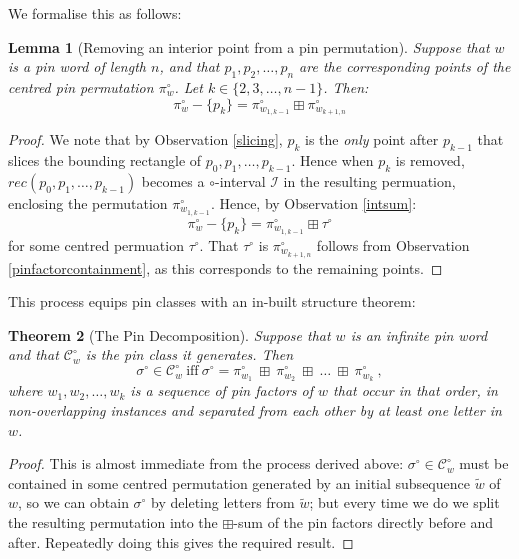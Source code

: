\documentclass[11pt,a4paper]{article}
\newtheorem{thm}{Theorem}[section]
\newtheorem{lemma}[thm]{Lemma}
\theoremstyle{definition}
\newcommand{\CCC}{\mathcal{C}}
\let\C\CCC
\begin{document}
We formalise this as follows:

\begin{lemma}[Removing an interior point from a pin permutation] \label{lemma:pindec}
Suppose that $w$ is a pin word of length $n$, and that $p_{1}, p_{2}, \dots, p_{n}$ are the corresponding points of the centred pin permutation $\pi_{w}^{\circ}$. Let $k \in \{2,3,\dots,n-1\}$. Then:
\[
\pi_{w}^{\circ} - \{p_{k}\} = \pi_{w_{1,k-1}}^{\circ} \boxplus \pi_{w_{k+1,n}}^{\circ}
\]
\end{lemma}

\begin{proof}
We note that by Observation \ref{slicing}, $p_{k}$ is the \emph{only} point after $p_{k-1}$ that slices the bounding rectangle of $p_{0}, p_{1}, \dots, p_{k-1}$. Hence when $p_{k}$ is removed, $rec(p_{0}, p_{1}, \dots, p_{k-1})$ becomes a $\circ$-interval $\mathcal{I}$ in the resulting permuation, enclosing the permutation $\pi^{\circ}_{w_{1,k-1}}$. Hence, by Observation \ref{intsum}:
\[
\pi_{w}^{\circ} - \{p_{k}\} = \pi_{w_{1,k-1}}^{\circ} \boxplus \tau^{\circ}
\]
for some centred permuation $\tau^{\circ}$. That $\tau^{\circ}$ is $\pi_{w_{k+1,n}}^{\circ}$ follows from Observation \ref{pinfactorcontainment}, as this corresponds to the remaining points.
\end{proof}

This process equips pin classes with an in-built structure theorem:

\begin{thm}[The Pin Decomposition] \label{pindec}
Suppose that $w$ is an infinite pin word and that $\C_{w}^{\circ}$ is the pin class it generates. Then
\[
\sigma^{\circ} \in \C_{w}^{\circ} \ \text{iff} \ \sigma^{\circ} = \pi_{w_{1}}^{\circ} \ \boxplus \ \pi_{w_{2}}^{\circ} \ \boxplus \ \dots \ \boxplus \ \pi_{w_{k}}^{\circ} \ ,
\]
where $w_{1}, w_{2}, \dots, w_{k}$ is a sequence of pin factors of $w$ that occur in that order, in non-overlapping instances and separated from each other by at least one letter in $w$.
\end{thm}

\begin{proof}
This is almost immediate from the process derived above: $\sigma^{\circ} \in \C_{w}^{\circ}$ must be contained in some centred permutation generated by an initial subsequence $\widetilde{w}$ of $w$, so we can obtain $\sigma^{\circ}$ by deleting letters from $\widetilde{w}$; but every time we do we split the resulting permutation into the $\boxplus$-sum of the pin factors directly before and after. Repeatedly doing this gives the required result.
\end{proof}
\end{document}
